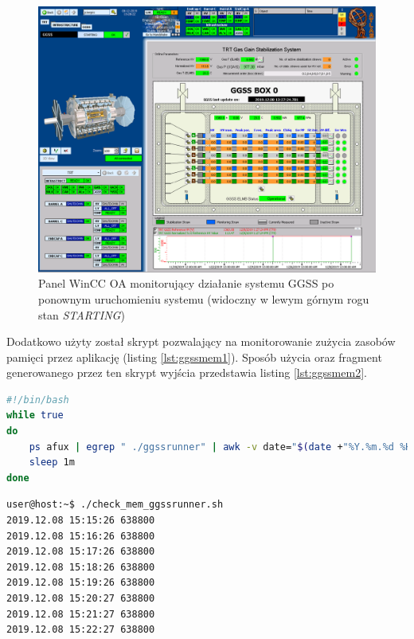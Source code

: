 \begin{figure}
\centering
\caption{Panel WinCC OA monitorujący działanie systemu GGSS po ponownym uruchomieniu systemu (widoczny w lewym górnym rogu stan \textit{STARTING})}
\label{fig:ggssafterstart}
\includegraphics[width=\textwidth]{res/png/ggssPoStarcie}
\end{figure}

\newpage
Dodatkowo użyty został skrypt pozwalający na monitorowanie zużycia zasobów pamięci przez aplikację (listing \ref{lst:ggssmem1}). Sposób użycia oraz fragment generowanego przez ten skrypt wyjścia przedstawia listing \ref{lst:ggssmem2}. 

\begin{lstlisting}[language=bash, caption={Skrypt \textit{check\_mem\_ggssrunner.sh} służacy do monitorowania pamięci używanej przez aplikację \textit{ggssrunner}}, label={lst:ggssmem1}]
#!/bin/bash
while true
do
    ps afux | egrep " ./ggssrunner" | awk -v date="$(date +"%Y.%m.%d %H:%M:%S")" '{print date, $5}'
    sleep 1m
done
\end{lstlisting}


\begin{lstlisting}[language=bash, caption={Wywołanie oraz fragment wyjścia skryptu \textit{check\_mem\_ggssrunner.sh} służacego do monitorowania pamięci używanej przez aplikację \textit{ggssrunner}}, label={lst:ggssmem2}]
user@host:~$ ./check_mem_ggssrunner.sh
2019.12.08 15:15:26 638800
2019.12.08 15:16:26 638800
2019.12.08 15:17:26 638800
2019.12.08 15:18:26 638800
2019.12.08 15:19:26 638800
2019.12.08 15:20:27 638800
2019.12.08 15:21:27 638800
2019.12.08 15:22:27 638800
\end{lstlisting}

